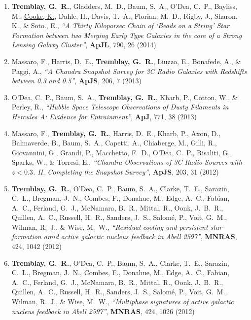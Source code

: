 \documentclass[11pt]{article}
\begin{document}
\begin{enumerate}
\item \textbf{Tremblay, G.~R.}, Gladders, M.~D., Baum, S.~A., O'Dea, C.~P., Bayliss, M., \uline{Cooke, K.}, Dahle, H., Davis, T.~A., Florian, M.~D., Rigby, J., Sharon, K., \& Soto., E.,   \textit{``A Thirty Kiloparsec Chain of `Beads on a String' Star Formation between two Merging Early Type Galaxies in the core of a Strong Lensing Galaxy Cluster''}, \textbf{ApJL}, 790, 26 (2014)


\item Massaro, F., Harris, D.~E., \textbf{Tremblay, G.~R.}, Liuzzo, E., Bonafede, A.,
\& Paggi, A., \textit{``A Chandra Snapshot Survey for 3C Radio Galaxies with Redshifts between 0.3 and 0.5''}, \textbf{ApJS}, 206,  7 (2013)


\item O'Dea, C.~P., Baum, S.~A., \textbf{Tremblay, G.~R.}, Kharb, P., Cotton, W.,
\& Perley, R.,  \textit{``Hubble Space Telescope Observations of Dusty Filaments in Hercules A: Evidence for Entrainment''}, \textbf{ApJ}, 771,  38 (2013)


\item Massaro, F., \textbf{Tremblay, G.~R.}, Harris, D.~E., Kharb, P., Axon, D.,
Balmaverde, B., Baum, S.~A., Capetti, A., Chiaberge, M., Gilli, R.,
Giovannini, G., Grandi, P., Macchetto, F.~D., O'Dea, C.~P., Risaliti, G.,
Sparks, W., \& Torresi, E.,  \textit{``Chandra Observations of 3C Radio Sources with $z < 0.3$. II. Completing the Snapshot Survey''}, \textbf{ApJS}, 203,  31 (2012)


\item \textbf{Tremblay, G.~R.}, O'Dea, C.~P., Baum, S.~A., Clarke, T.~E., Sarazin,
C.~L., Bregman, J.~N., Combes, F., Donahue, M., Edge, A.~C., Fabian, A.~C.,
Ferland, G.~J., McNamara, B.~R., Mittal, R., Oonk, J.~B.~R., Quillen,
A.~C., Russell, H.~R., Sanders, J.~S., Salom{\'e}, P., Voit, G.~M., Wilman,
R.~J., \& Wise, M.~W., \textit{``Residual cooling and persistent star formation amid active galactic nucleus feedback in Abell 2597''}, \textbf{MNRAS}, 424,  1042 (2012)


\item \textbf{Tremblay, G.~R.}, O'Dea, C.~P., Baum, S.~A., Clarke, T.~E., Sarazin,
C.~L., Bregman, J.~N., Combes, F., Donahue, M., Edge, A.~C., Fabian, A.~C.,
Ferland, G.~J., McNamara, B.~R., Mittal, R., Oonk, J.~B.~R., Quillen,
A.~C., Russell, H.~R., Sanders, J.~S., Salom{\'e}, P., Voit, G.~M., Wilman,
R.~J., \& Wise, M.~W., \textit{ ``Multiphase signatures of active galactic nucleus feedback in Abell 2597''}, \textbf{MNRAS}, 424,  1026 (2012)




\end{enumerate}
\end{document}
